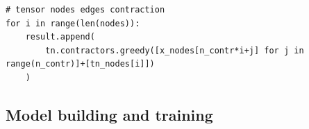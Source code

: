 \documentclass[xcolor=table,8pt]{beamer}
\begin{document}
\begin{frame}[t, fragile]
        \begin{lstlisting}[style=mypython, numbers=none, frame=single, aboveskip=2.5pt, belowskip=2.5pt, backgroundcolor=\color{white},rulecolor=\color{beamer@blendedblue},framerule=0.1pt]
# tensor nodes edges contraction
for i in range(len(nodes)):
    result.append(
        tn.contractors.greedy([x_nodes[n_contr*i+j] for j in range(n_contr)]+[tn_nodes[i]])
    )
        \end{lstlisting}
    \end{frame}
    
    
  
    
    \subsection{Model building and training}
\end{document}
